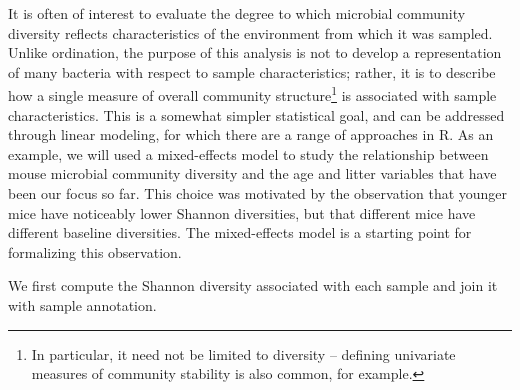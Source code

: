It is often of interest to evaluate the degree to which microbial community diversity
reflects characteristics of the environment from which it
was sampled. Unlike ordination, the purpose of this analysis is not to
develop a representation of many bacteria with respect
to sample characteristics; rather, it is to describe how a single
measure of overall community structure\footnote{In particular, it need
  not be limited to diversity -- defining univariate measures of
  community stability is also common, for example.} is associated with
sample characteristics. This is a somewhat simpler statistical goal,
and can be addressed through linear modeling, for which there are a
range of approaches in R. As an example, we will used a mixed-effects
model to study the relationship between mouse microbial community
diversity and the age and litter variables that have been our focus so
far. This choice was motivated by the observation that younger
mice have noticeably lower Shannon diversities, but that different
mice have different baseline diversities. The mixed-effects model is a
starting point for formalizing this observation.

We first compute the Shannon diversity associated with each sample
and join it with sample annotation.

\begin{knitrout}
\color{fgcolor}
\end{knitrout}

